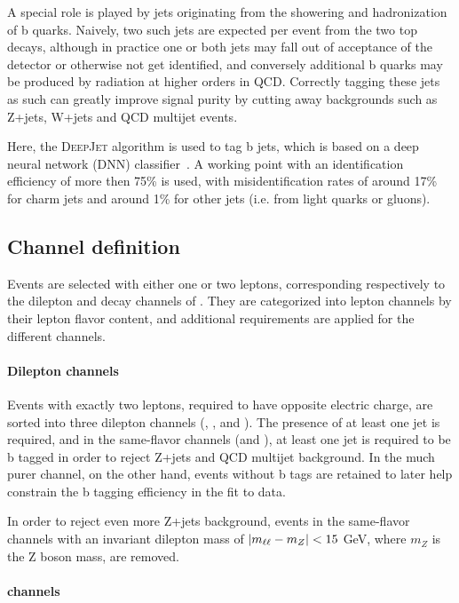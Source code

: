 A special role is played by jets originating from the showering and hadronization of b quarks. Naively, two such jets are expected per \ttbar event from the two top decays, although in practice one or both jets may fall out of acceptance of the detector or otherwise not get identified, and conversely additional b quarks may be produced by radiation at higher orders in QCD. Correctly tagging these jets as such can greatly improve signal purity by cutting away backgrounds such as Z+jets, W+jets and QCD multijet events.

Here, the \textsc{DeepJet} algorithm is used to tag b jets, which is based on a deep neural network (DNN) classifier~\cite{DeepJet:2020,CMS:BTV-16-002}. A working point with an identification efficiency of more then 75\% is used, with misidentification rates of around 17\% for charm jets and around 1\% for other jets (i.e. from light quarks or gluons).

\subsection{Channel definition}
\label{sec:ttxs:channels}

Events are selected with either one or two leptons, corresponding respectively to the dilepton and \ljets decay channels of \ttbar. They are categorized into lepton channels by their lepton flavor content, and additional requirements are applied for the different channels. 

\paragraph{Dilepton channels}

Events with exactly two leptons, required to have opposite electric charge, are sorted into three dilepton channels (\emu, \ee, and \mumu). The presence of at least one jet is required, and in the same-flavor channels (\ee and \mumu), at least one jet is required to be b tagged in order to reject Z+jets and QCD multijet background. In the much purer \emu channel, on the other hand, events without b tags are retained to later help constrain the b tagging efficiency in the fit to data.

In order to reject even more Z+jets background, events in the same-flavor channels with an invariant dilepton mass of $| m_{\ell\ell} - m_Z | < 15$ GeV, where $m_Z$ is the Z boson mass, are removed.

\paragraph{\ljets channels}

